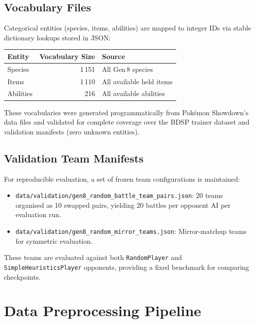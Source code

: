 \subsection{Vocabulary Files}

Categorical entities (species, items, abilities) are mapped to integer IDs via
stable dictionary lookups stored in JSON:

\begin{center}
\small
\begin{tabularx}{0.8\textwidth}{l r l}
  \toprule
  \textbf{Entity} & \textbf{Vocabulary Size} & \textbf{Source} \\
  \midrule
  Species  & 1\,151 & All Gen\,8 species \\
  Items    & 1\,110 & All available held items \\
  Abilities & 216   & All available abilities \\
  \bottomrule
\end{tabularx}
\end{center}

These vocabularies were generated programmatically from Pok\'{e}mon Showdown's
data files and validated for complete coverage over the BDSP trainer dataset
and validation manifests (zero unknown entities).

\subsection{Validation Team Manifests}

For reproducible evaluation, a set of frozen team configurations is maintained:

\begin{itemize}
  \item \texttt{data/validation/gen8\_random\_battle\_team\_pairs.json}:
        20 teams organised as 10 swapped pairs, yielding 20 battles per opponent AI per
        evaluation run.
  \item \texttt{data/validation/gen8\_random\_mirror\_teams.json}:
        Mirror-matchup teams for symmetric evaluation.
\end{itemize}

These teams are evaluated against both \texttt{RandomPlayer} and
\texttt{SimpleHeuristicsPlayer} opponents, providing a fixed benchmark for
comparing checkpoints.

\section{Data Preprocessing Pipeline}

